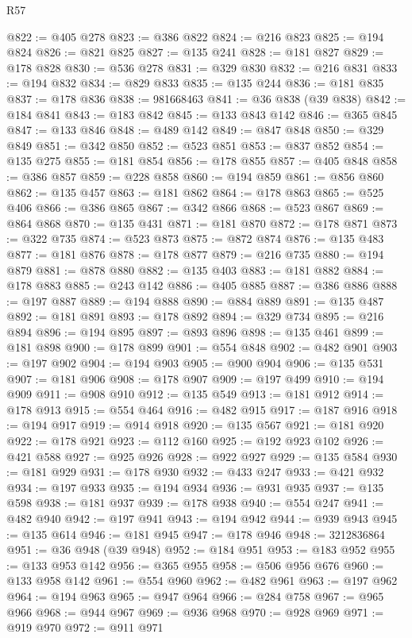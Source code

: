 \begin{lexlean}{R57}
\begin{coremodule}
@822 := @405 @278
@823 := @386 @822
@824 := @216 @823
@825 := @194 @824
@826 := @821 @825
@827 := @135 @241
@828 := @181 @827
@829 := @178 @828
@830 := @536 @278
@831 := @329 @830
@832 := @216 @831
@833 := @194 @832
@834 := @829 @833
@835 := @135 @244
@836 := @181 @835
@837 := @178 @836
@838 := 981668463
@841 := @36 @838 (@39 @838)
@842 := @184 @841
@843 := @183 @842
@845 := @133 @843 @142
@846 := @365 @845
@847 := @133 @846
@848 := @489 @142
@849 := @847 @848
@850 := @329 @849
@851 := @342 @850
@852 := @523 @851
@853 := @837 @852
@854 := @135 @275
@855 := @181 @854
@856 := @178 @855
@857 := @405 @848
@858 := @386 @857
@859 := @228 @858
@860 := @194 @859
@861 := @856 @860
@862 := @135 @457
@863 := @181 @862
@864 := @178 @863
@865 := @525 @406
@866 := @386 @865
@867 := @342 @866
@868 := @523 @867
@869 := @864 @868
@870 := @135 @431
@871 := @181 @870
@872 := @178 @871
@873 := @322 @735
@874 := @523 @873
@875 := @872 @874
@876 := @135 @483
@877 := @181 @876
@878 := @178 @877
@879 := @216 @735
@880 := @194 @879
@881 := @878 @880
@882 := @135 @403
@883 := @181 @882
@884 := @178 @883
@885 := @243 @142
@886 := @405 @885
@887 := @386 @886
@888 := @197 @887
@889 := @194 @888
@890 := @884 @889
@891 := @135 @487
@892 := @181 @891
@893 := @178 @892
@894 := @329 @734
@895 := @216 @894
@896 := @194 @895
@897 := @893 @896
@898 := @135 @461
@899 := @181 @898
@900 := @178 @899
@901 := @554 @848
@902 := @482 @901
@903 := @197 @902
@904 := @194 @903
@905 := @900 @904
@906 := @135 @531
@907 := @181 @906
@908 := @178 @907
@909 := @197 @499
@910 := @194 @909
@911 := @908 @910
@912 := @135 @549
@913 := @181 @912
@914 := @178 @913
@915 := @554 @464
@916 := @482 @915
@917 := @187 @916
@918 := @194 @917
@919 := @914 @918
@920 := @135 @567
@921 := @181 @920
@922 := @178 @921
@923 := @112 @160
@925 := @192 @923 @102
@926 := @421 @588
@927 := @925 @926
@928 := @922 @927
@929 := @135 @584
@930 := @181 @929
@931 := @178 @930
@932 := @433 @247
@933 := @421 @932
@934 := @197 @933
@935 := @194 @934
@936 := @931 @935
@937 := @135 @598
@938 := @181 @937
@939 := @178 @938
@940 := @554 @247
@941 := @482 @940
@942 := @197 @941
@943 := @194 @942
@944 := @939 @943
@945 := @135 @614
@946 := @181 @945
@947 := @178 @946
@948 := 3212836864
@951 := @36 @948 (@39 @948)
@952 := @184 @951
@953 := @183 @952
@955 := @133 @953 @142
@956 := @365 @955
@958 := @506 @956 @676
@960 := @133 @958 @142
@961 := @554 @960
@962 := @482 @961
@963 := @197 @962
@964 := @194 @963
@965 := @947 @964
@966 := @284 @758
@967 := @965 @966
@968 := @944 @967
@969 := @936 @968
@970 := @928 @969
@971 := @919 @970
@972 := @911 @971

\end{coremodule}
\end{lexlean}
